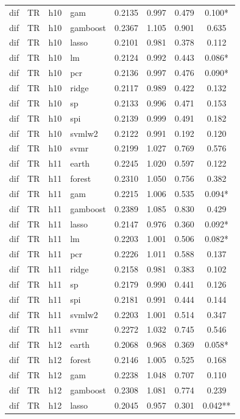 \begin{ThreePartTable}
\begin{longtable}[t]{llclcccc}
dif & TR & h10 & gam & 0.2135 & 0.997 & 0.479 & 0.100*\\
dif & TR & h10 & gamboost & 0.2367 & 1.105 & 0.901 & 0.635\\
dif & TR & h10 & lasso & 0.2101 & 0.981 & 0.378 & 0.112\\
dif & TR & h10 & lm & 0.2124 & 0.992 & 0.443 & 0.086*\\
dif & TR & h10 & pcr & 0.2136 & 0.997 & 0.476 & 0.090*\\
dif & TR & h10 & ridge & 0.2117 & 0.989 & 0.422 & 0.132\\
dif & TR & h10 & sp & 0.2133 & 0.996 & 0.471 & 0.153\\
dif & TR & h10 & spi & 0.2139 & 0.999 & 0.491 & 0.182\\
dif & TR & h10 & svmlw2 & 0.2122 & 0.991 & 0.192 & 0.120\\
dif & TR & h10 & svmr & 0.2199 & 1.027 & 0.769 & 0.576\\
\addlinespace
dif & TR & h11 & earth & 0.2245 & 1.020 & 0.597 & 0.122\\
dif & TR & h11 & forest & 0.2310 & 1.050 & 0.756 & 0.382\\
dif & TR & h11 & gam & 0.2215 & 1.006 & 0.535 & 0.094*\\
dif & TR & h11 & gamboost & 0.2389 & 1.085 & 0.830 & 0.429\\
dif & TR & h11 & lasso & 0.2147 & 0.976 & 0.360 & 0.092*\\
dif & TR & h11 & lm & 0.2203 & 1.001 & 0.506 & 0.082*\\
dif & TR & h11 & pcr & 0.2226 & 1.011 & 0.588 & 0.137\\
dif & TR & h11 & ridge & 0.2158 & 0.981 & 0.383 & 0.102\\
dif & TR & h11 & sp & 0.2179 & 0.990 & 0.441 & 0.126\\
dif & TR & h11 & spi & 0.2181 & 0.991 & 0.444 & 0.144\\
dif & TR & h11 & svmlw2 & 0.2203 & 1.001 & 0.514 & 0.347\\
dif & TR & h11 & svmr & 0.2272 & 1.032 & 0.745 & 0.546\\
\addlinespace
dif & TR & h12 & earth & 0.2068 & 0.968 & 0.369 & 0.058*\\
dif & TR & h12 & forest & 0.2146 & 1.005 & 0.525 & 0.168\\
dif & TR & h12 & gam & 0.2238 & 1.048 & 0.707 & 0.110\\
dif & TR & h12 & gamboost & 0.2308 & 1.081 & 0.774 & 0.239\\
dif & TR & h12 & lasso & 0.2045 & 0.957 & 0.301 & 0.042**\\

\end{longtable}
\end{ThreePartTable}
